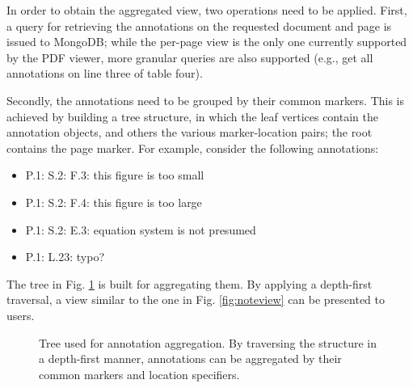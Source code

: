 In order to obtain the aggregated view, two operations need to be applied.
First, a query for retrieving the annotations on the requested document and
page is issued to MongoDB; while the per-page view is the only one currently
supported by the PDF viewer, more granular queries are also supported (e.g., get
all annotations on line three of table four).

Secondly, the annotations need to be grouped by their common markers. This is
achieved by building a tree structure, in which the leaf vertices contain the
annotation objects, and others the various marker-location pairs; the root contains
the page marker. For example, consider the following annotations:
\begin{itemize}
    \item P.1: S.2: F.3: this figure is too small
    \item P.1: S.2: F.4: this figure is too large
    \item P.1: S.2: E.3: equation system is not presumed
    \item P.1: L.23: typo?
\end{itemize}
The tree in Fig. \ref{fig:tree} is built for aggregating them. By applying a
depth-first traversal, a view similar to the one in Fig.  \ref{fig:noteview}
can be presented to users.

\begin{figure}[!ht]
  \centering
  \caption[Tree used for annotation aggregation.]
          {Tree used for annotation aggregation. By traversing the structure in
           a  depth-first manner, annotations can be aggregated by their common
           markers and location specifiers.}
  \label{fig:tree}
\end{figure}

